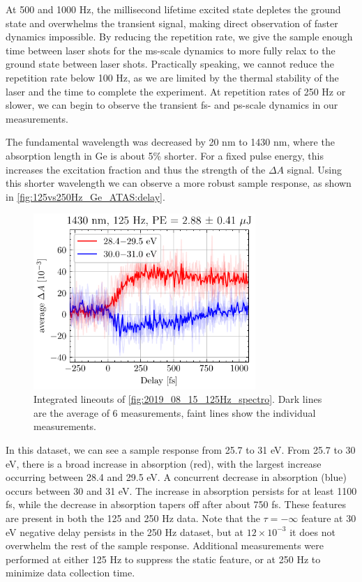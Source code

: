 At 500 and 1000 Hz, the millisecond lifetime excited state depletes the ground state and overwhelms the transient signal, making direct observation of faster dynamics impossible. By reducing the repetition rate, we give the sample enough time between laser shots for the ms-scale dynamics to more fully relax to the ground state between laser shots. Practically speaking, we cannot reduce the repetition rate below 100 Hz, as we are limited by the thermal stability of the laser and the time to complete the experiment. At repetition rates of 250 Hz or slower, we can begin to observe the transient fs- and ps-scale dynamics in our measurements.

The fundamental wavelength was decreased by 20 nm to 1430 nm, where the absorption length in Ge is about 5\% shorter. For a fixed pulse energy, this increases the excitation fraction and thus the strength of the $\Delta A$ signal. Using this shorter wavelength we can observe a more robust sample response, as shown in \cref{fig:125vs250Hz_Ge_ATAS:delay}.

\begin{figure}
	\centering
	\includegraphics[width=0.75\textwidth]{figures/chap4/Delay123456_1430nm_125Hz_2p88uJ_AvgBands.pdf}
	\caption{Integrated lineouts of \cref{fig:2019_08_15_125Hz_spectro}. Dark lines are the average of 6 measurements, faint lines show the individual measurements.}
	\label{fig:Delay123456_1430nm_125Hz_2p88uJ_AvgBands}
\end{figure}

In this dataset, we can see a sample response from 25.7 to 31 eV. From 25.7 to 30 eV, there is a broad increase in absorption (red), with the largest increase occurring between 28.4 and 29.5 eV. A concurrent decrease in absorption (blue) occurs between 30 and 31 eV. The increase in absorption persists for at least 1100 fs, while the decrease in absorption tapers off after about 750 fs. These features are present in both the 125 and 250 Hz data. Note that the $\tau=-\infty$ feature at 30 eV negative delay persists in the 250 Hz dataset, but at $12 \times 10^{-3}$ it does not overwhelm the rest of the sample response. Additional measurements were performed at either 125 Hz to suppress the static feature, or at 250 Hz to minimize data collection time.

